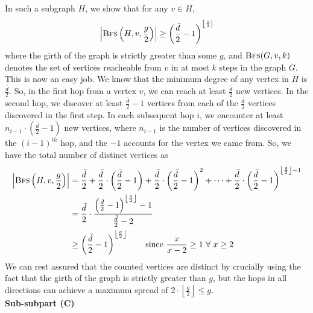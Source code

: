\documentclass[9pt]{article}
\begin{document}
In such a subgraph $H$, we show that for any $v \in H$,
\begin{equation}
    \left\lvert \textsc{Bfs}\left(H, v, \frac{g}{2} \right) \right\rvert
    \geq \left( \frac{\bar{d}}{2} - 1 \right)^{\left\lfloor \frac{g}{2} \right\rvert}
\end{equation}
where the girth of the graph is strictly greater than some $g$, and $\textsc{Bfs}(G, v, k)$
denotes the set of vertices reacheable from $v$ in at most $k$ steps in the graph $G$. \\
This is now an easy job. We know that the minimum degree of any vertex in $H$ is $\frac{\bar{d}}{2}$.
So, in the first hop from a vertex $v$, we can reach at least $\frac{\bar{d}}{2}$ new vertices.
In the  second hop, we discover at least $\frac{\bar{d}}{2} - 1$ vertices from each of the
$\frac{\bar{d}}{2}$ vertices discovered in the first step. In each subsequent hop $i$, we
encounter at least $n_{i-1} \cdot \left( \frac{\bar{d}}{2} - 1 \right)$ new vertices, where
$n_{i-1}$ is the number of vertices discovered in the $(i-1)^{th}$ hop, and the $-1$ accounts
for the vertex we came from. So, we have the total number of distinct vertices as
\begin{align}
    \begin{split}
        \left\lvert \textsc{Bfs}\left(H, v, \frac{g}{2} \right) \right\rvert
        &= \frac{\bar{d}}{2} + \frac{\bar{d}}{2} \cdot \left( \frac{\bar{d}}{2} - 1 \right)
        + \frac{\bar{d}}{2} \cdot \left( \frac{\bar{d}}{2} - 1 \right)^{2} + \cdots
        + \frac{\bar{d}}{2} \cdot \left( \frac{\bar{d}}{2} - 1 \right)^{\left\lfloor \frac{g}{2} \right\rfloor - 1} \\
        &= \frac{\bar{d}}{2} \cdot \frac{\left( \frac{\bar{d}}{2} - 1 \right)^{\left\lfloor \frac{g}{2} \right\rfloor} - 1}{\frac{\bar{d}}{2} - 2} \\
        &\geq \left( \frac{\bar{d}}{2} - 1 \right)^{\left\lfloor \frac{g}{2} \right\rfloor}
        \qquad \text{since } \frac{x}{x - 2} \geq 1 \ \forall \ x \geq 2
    \end{split}
\end{align}
We can rest assured that the counted vertices are distinct by crucially using the fact that
the girth of the graph is strictly greater than $g$, but the hops in all directions can
achieve a maximum spread of $2 \cdot \left\lfloor \frac{g}{2} \right\rfloor \leq g$.
\vspace*{10pt} \\
\textbf{Sub-subpart (C)}
\vspace*{5pt} \\
\end{document}
